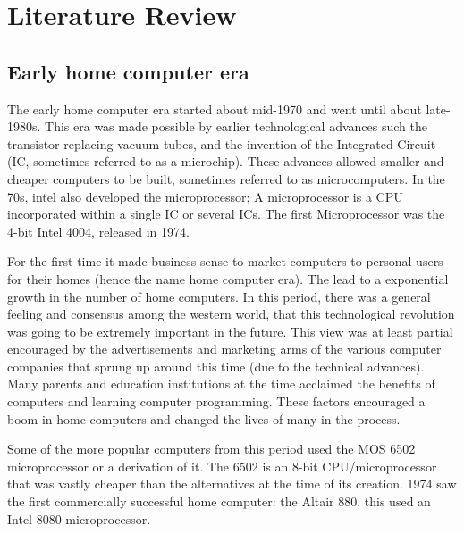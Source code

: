 

\chapter{Literature Review} %
\label{Chapter2} %

\section{Early home computer era}
The early home computer era started about mid-1970 and went until about late-1980s. This era was made possible by earlier technological advances such the transistor replacing vacuum tubes, and the invention of the Integrated Circuit (IC, sometimes referred to as a microchip). These advances allowed smaller and cheaper computers to be built, sometimes referred to as microcomputers. In the 70s, intel also developed the microprocessor; A microprocessor is a CPU incorporated within a single IC or several ICs. The first Microprocessor was the 4-bit Intel 4004, released in 1974.

For the first time it made business sense to market computers to personal users for their homes (hence the name home computer era). The lead to a exponential growth in the number of home computers. In this period, there was a general feeling and consensus among the western world, that this technological revolution was going to be extremely important in the future. This view was at least partial encouraged by the advertisements and marketing arms of the various computer companies that sprung up around this time (due to the technical advances). Many parents and education institutions at the time acclaimed the benefits of computers and learning computer programming. These factors encouraged a boom in home computers and changed the lives of many in the process. \cite{RN23}

Some of the more popular computers from this period used the MOS 6502 microprocessor or a derivation of it. The 6502 is an 8-bit CPU/microprocessor that was vastly cheaper than the alternatives at the time of its creation. 1974 saw the first commercially successful home computer: the Altair 880, this used an Intel 8080 microprocessor. 


